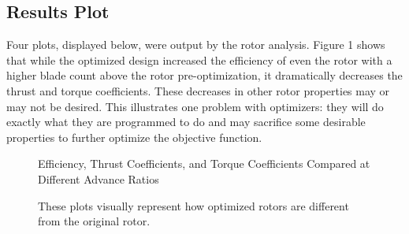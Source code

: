\documentclass[journal ]{new-aiaa}
\begin{document}
\subsection{Results Plot}

Four plots, displayed below, were output by the rotor analysis. Figure 1 shows that while the optimized design increased the efficiency of even the rotor with a higher blade count above the rotor pre-optimization, it dramatically decreases the thrust and torque coefficients. These decreases in other rotor properties may or may not be desired. This illustrates one problem with optimizers: they will do exactly what they are programmed to do and may sacrifice some desirable properties to further optimize the objective function.

\begin{figure}[H]
\centering

	\hspace{1em}
	\caption{Efficiency, Thrust Coefficients, and Torque Coefficients Compared at Different Advance Ratios}
	\captionsetup{aboveskip=0pt,font=it}
	\caption*{These plots visually represent how optimized rotors are different from the original rotor.}
	\label{fig:1}
\end{figure}
\end{document}
